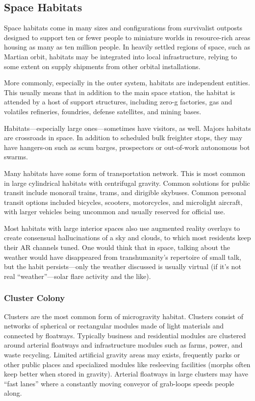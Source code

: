 \subsection{Space Habitats}

Space habitats come in many sizes and configurations
from survivalist outposts designed to support
ten or fewer people to miniature worlds in resource-rich
areas housing as many as ten million people. In
heavily settled regions of space, such as Martian orbit, 
habitats may be integrated into local infrastructure, 
relying to some extent on supply shipments from other 
orbital installations.

More commonly, especially in the outer system, 
habitats are independent entities. This usually means 
that in addition to the main space station, the habitat 
is attended by a host of support structures, including 
zero-g factories, gas and volatiles refineries, foundries, 
defense satellites, and mining bases.

Habitats—especially large ones—sometimes have 
visitors, as well. Majors habitats are crossroads in 
space. In addition to scheduled bulk freighter stops, 
they may have hangers-on such as scum barges, prospectors
or out-of-work autonomous bot swarms.

Many habitats have some form of transportation 
network. This is most common in large cylindrical 
habitats with centrifugal gravity. Common solutions 
for public transit include monorail trains, trams, and 
dirigible skybuses. Common personal transit options 
included bicycles, scooters, motorcycles, and microlight
aircraft, with larger vehicles being uncommon
and usually reserved for official use.

Most habitats with large interior spaces also use augmented
reality overlays to create consensual hallucinations
of a sky and clouds, to which most residents keep
their AR channels tuned. One would think that in space, 
talking about the weather would have disappeared from 
transhumanity's repertoire of small talk, but the habit 
persists—only the weather discussed is usually virtual (if 
it's not real ``weather''—solar flare activity and the like).

\subsubsection{Cluster Colony}

Clusters are the most common form of microgravity 
habitat. Clusters consist of networks of spherical or 
rectangular modules made of light materials and connected
by floatways. Typically business and residential
modules are clustered around arterial floatways and infrastructure
modules such as farms, power, and waste
recycling. Limited artificial gravity areas may exists, 
frequently parks or other public places and specialized 
modules like resleeving facilities (morphs often keep 
better when stored in gravity). Arterial floatways in 
large clusters may have ``fast lanes'' where a constantly 
moving conveyor of grab-loops speeds people along.

